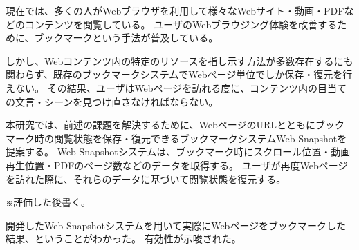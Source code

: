 \begin{jabstract}

  現在では、多くの人がWebブラウザを利用して様々なWebサイト・動画・PDFなどのコンテンツを閲覧している。
  ユーザのWebブラウジング体験を改善するために、ブックマークという手法が普及している。

  しかし、Webコンテンツ内の特定のリソースを指し示す方法が多数存在するにも関わらず、既存のブックマークシステムでWebページ単位でしか保存・復元を行えない。
  その結果、ユーザはWebページを訪れる度に、コンテンツ内の目当ての文言・シーンを見つけ直さなければならない。

  本研究では、前述の課題を解決するために、WebページのURLとともにブックマーク時の閲覧状態を保存・復元できるブックマークシステムWeb-Snapshotを提案する。
  Web-Snapshotシステムは、ブックマーク時にスクロール位置・動画再生位置・PDFのページ数などのデータを取得する。
  ユーザが再度Webページを訪れた際に、それらのデータに基づいて閲覧状態を復元する。

  ※評価した後書く。

  開発したWeb-Snapshotシステムを用いて実際にWebページをブックマークした結果、ということがわかった。
  有効性が示唆された。

\end{jabstract}
